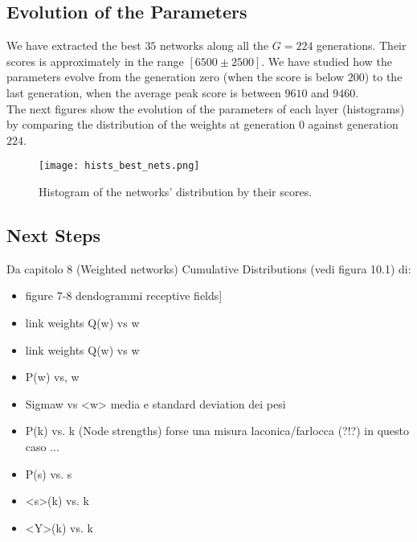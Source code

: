 \documentclass[11pt]{scrartcl} %
\begin{document}
\subsection{Evolution of the Parameters}

We have extracted the best $35$ networks along all the $G=224$ generations. Their scores is approximately in the range $[6500 \pm 2500]$. We have studied how the parameters evolve from the generation zero (when the score is below $200$) to the last generation, when the average peak score is between $9610$ and $9460$. \\
The next figures show the evolution of the parameters of each layer (histograms) by comparing the distribution of the weights at generation $0$ against generation $224$.

\begin{figure}[h] %
	\centering
	\texttt{[image: hists\_best\_nets.png]} %
	\caption{ Histogram of the networks' distribution by their scores.}
\end{figure}

\subsection{Next Steps}

Da capitolo 8 (Weighted networks) Cumulative Distributions (vedi figura 10.1) di:

\begin{itemize}
	\item figure 7-8 dendogrammi receptive fields] 
	\item link weights Q(w) vs w
	\item link weights Q(w) vs w 
	\item P(w) vs, w
	\item Sigmaw vs <w>   media e standard deviation dei pesi 
	\item P(k)  vs. k (Node strengths)  forse una misura laconica/farlocca (?!?) in questo caso ... 
	\item P(s)  vs. s 
	\item <s>(k) vs. k
	\item <Y>(k) vs. k 
\end{itemize}
\end{document}
